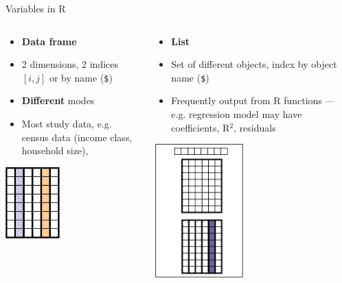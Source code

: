 \documentclass[aspectratio=169]{beamer}\usepackage[]{graphicx}\usepackage[]{color}
\begin{document}
\begin{frame}{Variables in R}
\begin{columns}
	\begin{column}{0.50\textwidth}
		\begin{itemize}
  		\item \textbf{Data frame}
		  \item 2 dimensions, 2 indices $[i,j]$ or by name (\texttt{\$})
		  \item \textbf{Different} modes
		  \item Most study data, e.g. census data (income class, household size), 
		\end{itemize}
		\begin{center}
			\includegraphics[width=0.4\textwidth]{./images/2d_dataframe.png}\\
		\end{center}
	\end{column}
	\begin{column}{0.50\textwidth}
		\begin{itemize}
  		\item \textbf{List}
		  \item Set of different objects, index by object name (\texttt{\$})
		  \item Frequently output from R functions --- e.g. regression model may have coefficients, R$^2$, residuals
		\end{itemize}
		\begin{center}
			\includegraphics[width=0.45\textwidth]{./images/list.png}

\end{center}
\end{column}
\end{columns}
\end{frame}
\end{document}
